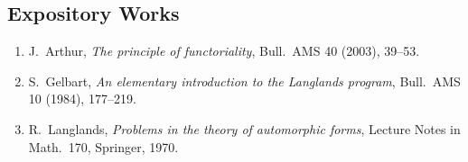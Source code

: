 \subsection*{Expository Works}
\begin{enumerate}
    \item J.\ Arthur, \textit{The principle of functoriality}, Bull.\ AMS 40 (2003), 39--53.
    \item S.\ Gelbart, \textit{An elementary introduction to the Langlands program}, Bull.\ AMS 10 (1984), 177--219.
    \item R.\ Langlands, \textit{Problems in the theory of automorphic forms}, Lecture Notes in Math.\ 170, Springer, 1970.
\end{enumerate}

